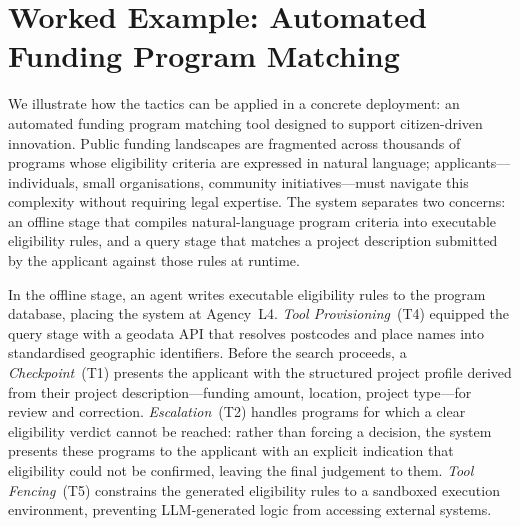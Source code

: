 \section{Worked Example: Automated Funding Program Matching}\label{sec:application}

We illustrate how the tactics can be applied in a concrete deployment: an automated funding program matching tool designed to support citizen-driven innovation. Public funding landscapes are fragmented across thousands of programs whose eligibility criteria are expressed in natural language; applicants---individuals, small organisations, community initiatives---must navigate this complexity without requiring legal expertise. The system separates two concerns: an offline stage that compiles natural-language program criteria into executable eligibility rules, and a query stage that matches a project description submitted by the applicant against those rules at runtime.

In the offline stage, an agent writes executable eligibility rules to the program database, placing the system at Agency~L4. \emph{Tool Provisioning}~(T4) equipped the query stage with a geodata API that resolves postcodes and place names into standardised geographic identifiers. Before the search proceeds, a \emph{Checkpoint}~(T1) presents the applicant with the structured project profile derived from their project description---funding amount, location, project type---for review and correction. \emph{Escalation}~(T2) handles programs for which a clear eligibility verdict cannot be reached: rather than forcing a decision, the system presents these programs to the applicant with an explicit indication that eligibility could not be confirmed, leaving the final judgement to them. \emph{Tool Fencing}~(T5) constrains the generated eligibility rules to a sandboxed execution environment, preventing LLM-generated logic from accessing external systems.

